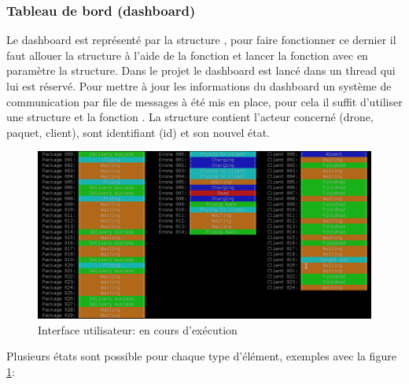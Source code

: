 \documentclass[article, backcover, french, nodocumentinfo]{upmethodology-document}
\begin{document}
			\subsubsection{Tableau de bord (dashboard)}
					Le dashboard est représenté par la structure , pour faire fonctionner ce dernier il faut allouer la structure à l'aide de la fonction  et lancer la fonction  avec en paramètre la structure. Dans le projet le dashboard est lancé dans un thread qui lui est réservé.
					Pour mettre à jour les informations du dashboard un système de communication par file de messages à été mis en place, pour cela il suffit d'utiliser une structure  et la fonction . La structure  contient l'acteur concerné (drone, paquet, client), sont identifiant (id) et son nouvel état.
					\begin{figure}[H]
						\centering
						\includegraphics[width=\textwidth]{figures/UI1}
						\caption{Interface utilisateur: en cours d’exécution}
						\label{fig:UIrunning}
					\end{figure}
					Plusieurs états sont possible pour chaque type d'élément, exemples avec la figure \ref{fig:UIrunning}:
\end{document}
